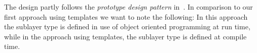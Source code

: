 %

The
design partly follows  the {\em prototype design pattern}
in~\cite{cgal:ghjv-dpero-95}. In comparison to our first approach
using templates we want to note the following: In this approach
the sublayer type is defined in
use of object oriented programming at run time, while in the
approach using templates, the sublayer type is defined at compile
time. 


